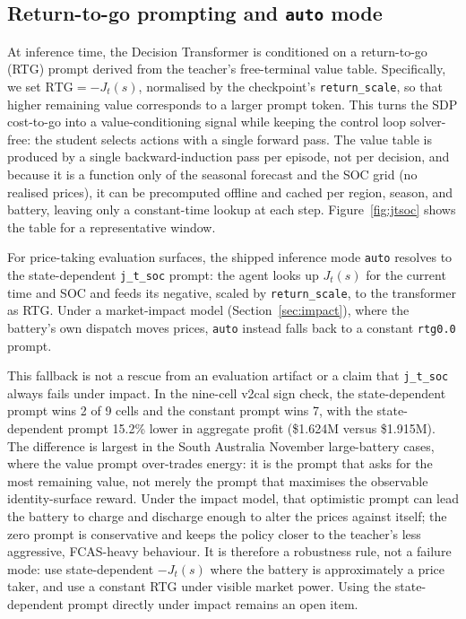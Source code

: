 \documentclass{article}
\begin{document}
\subsection{Return-to-go prompting and \texttt{auto} mode}
\label{sec:prompting}

At inference time, the Decision Transformer is conditioned on a return-to-go
(RTG) prompt derived from the teacher's free-terminal value table. Specifically,
we set $\mathrm{RTG} = -J_t(s)$, normalised by the checkpoint's
\texttt{return\_scale}, so that higher remaining value corresponds to a larger
prompt token. This turns the SDP cost-to-go into a value-conditioning signal
while keeping the control loop solver-free: the student selects actions
with a single forward pass. The value table is produced by a single
backward-induction pass per episode, not per decision, and because it is a
function only of the seasonal forecast and the SOC grid (no realised prices), it
can be precomputed offline and cached per region, season, and battery, leaving
only a constant-time lookup at each step. Figure~\ref{fig:jtsoc} shows the table
for a representative window.

For price-taking evaluation surfaces, the shipped inference mode \texttt{auto}
resolves to the state-dependent \texttt{j\_t\_soc} prompt: the agent looks up
$J_t(s)$ for the current time and SOC and feeds its negative, scaled by
\texttt{return\_scale}, to the transformer as RTG. Under a market-impact model
(Section~\ref{sec:impact}), where the battery's own dispatch moves prices,
\texttt{auto} instead falls back to a constant \texttt{rtg0.0} prompt.

This fallback is not a rescue from an evaluation artifact or a claim that
\texttt{j\_t\_soc} always fails under impact. In the nine-cell v2cal sign check,
the state-dependent prompt wins 2 of 9 cells and the constant prompt wins 7,
with the state-dependent prompt 15.2\% lower in aggregate profit (\$1.624M
versus \$1.915M).
The difference is largest in the South Australia November large-battery cases,
where the value prompt over-trades energy: it is the prompt that asks for the
most remaining value, not merely the prompt that maximises the observable
identity-surface reward. Under the impact model, that optimistic prompt can
lead the battery to charge and discharge enough to alter the prices against
itself; the zero prompt is conservative and keeps the policy closer to the
teacher's less aggressive, FCAS-heavy behaviour. It is therefore a robustness
rule, not a failure mode: use state-dependent $-J_t(s)$ where the battery is
approximately a price taker, and use a constant RTG under visible market
power. Using the state-dependent prompt directly under impact remains an open
item.
\end{document}
